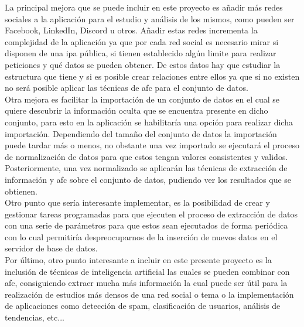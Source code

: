 \documentclass[../../main.tex]{subfiles}
\begin{document}
La principal mejora que se puede incluir en este proyecto es añadir más redes sociales a la aplicación para el estudio y análisis de los mismos, como pueden ser Facebook, LinkedIn, Discord u otros.
Añadir estas redes incrementa la complejidad de la aplicación ya que por cada red social es necesario mirar si disponen de una \Gls{ipa} pública, si tienen establecido algún limite para realizar peticiones y qué datos se pueden obtener.
De estos datos hay que estudiar la estructura que tiene y si es posible crear relaciones entre ellos ya que si no existen no será posible aplicar las técnicas de \Gls{afc} para el conjunto de datos. \\

Otra mejora es facilitar la importación de un conjunto de datos en el cual se quiere descubrir la información oculta que se encuentra presente en dicho conjunto, para esto en la aplicación se habilitaría una opción para realizar dicha importación. Dependiendo del tamaño del conjunto de datos la importación puede tardar más o menos, no obstante una vez importado se ejecutará el proceso de normalización de datos para que estos tengan valores consistentes y validos. Posteriormente, una vez normalizado se aplicarán las técnicas de extracción de información y \gls{afc} sobre el conjunto de datos, pudiendo ver los resultados que se obtienen. \\

Otro punto que sería interesante implementar, es la posibilidad de crear y gestionar tareas programadas para que ejecuten el proceso de extracción de datos con una serie de parámetros para que estos sean ejecutados de forma periódica con lo cual permitiría despreocuparnos de la inserción de nuevos datos en el servidor de base de datos.  \\

Por último, otro punto interesante a incluir en este presente proyecto es la inclusión de técnicas de inteligencia artificial las cuales se pueden combinar con \gls{afc}, consiguiendo extraer mucha más información la cual puede ser útil para la realización de estudios más densos de una red social o tema o la implementación de aplicaciones como detección de spam, clasificación de usuarios, análisis de tendencias, etc...  \\
\end{document}
